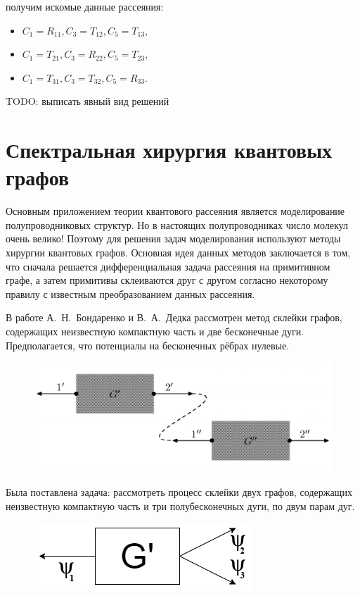\documentclass[a4 paper, 12 pt]{extarticle}
\begin{document}
   получим искомые данные рассеяния:
   \begin{itemize}
  	 \item $C_1 = R_{11}, C_3 = T_{12}, C_5 = T_{13}$, 
  	 \item $C_1 = T_{21}, C_3 = R_{22}, C_5 = T_{23}$,  
 	 \item $C_1 = T_{31}, C_3 = T_{32}, C_5 = R_{33}$.
   \end{itemize}

   TODO: выписать явный вид решений
   
   \pagebreak
   
   \section{Спектральная хирургия квантовых графов}
   Основным приложением теории квантового рассеяния является моделирование полупроводниковых структур. Но в настоящих полупроводниках число молекул очень велико! Поэтому для решения задач моделирования используют методы хирургии квантовых графов. Основная идея данных методов заключается в том, что сначала решается дифференциальная задача рассеяния на примитивном графе, а затем примитивы склеиваются друг с другом согласно некоторому правилу с известным преобразованием данных рассеяния.
   
   В работе А.~Н.~Бондаренко и В.~А.~Дедка \cite{SpectralSurgery} рассмотрен метод склейки графов, содержащих неизвестную компактную часть и две бесконечные дуги. Предполагается, что потенциалы на бесконечных рёбрах нулевые.
   \begin{figure}[!htb]
   	\centering
   	\includegraphics[scale=0.3]{skleika1.png}
   \end{figure}

   Была поставлена задача: рассмотреть процесс склейки двух графов, содержащих неизвестную компактную часть и три полубесконечных дуги, по двум парам дуг.
   \begin{figure}[!htb]
   	\centering
   	\includegraphics[scale=0.5]{g_prime.png}
   \end{figure}
\end{document}
